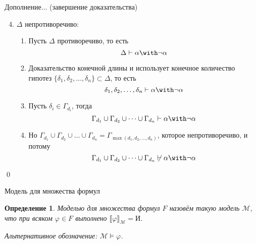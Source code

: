 \documentclass[aspectratio=169]{beamer}
\newtheorem{dfn}{Определение}[section]
\begin{document}
\begin{frame}{Дополнение... (завершение доказательства)}\vspace{-1cm}
\begin{block}{}
\begin{enumerate}\setcounter{enumi}{3}
  \item $\Delta$ непротиворечиво:
  \begin{enumerate}
    \item Пусть $\Delta$ противоречиво, то есть $$\Delta \vdash \alpha\with\neg\alpha$$\pause\vspace{-0.2cm}
    \item Доказательство конечной длины и использует конечное количество гипотез $\{\delta_1, \delta_2, \dots, \delta_n\} \subset \Delta$,
          то есть $$\delta_1, \delta_2, \dots, \delta_n \vdash \alpha\with\neg\alpha$$\pause\vspace{-0.2cm}
    \item Пусть $\delta_i \in \Gamma_{d_i}$, тогда $$\Gamma_{d_1}\cup \Gamma_{d_2}\cup \dots\cup \Gamma_{d_n} \vdash \alpha\with\neg\alpha$$\pause\vspace{-0.2cm}
    \item Но $\Gamma_{d_1} \cup \Gamma_{d_2} \cup \dots \cup \Gamma_{d_n} = \Gamma_{\max(d_1,d_2,\dots,d_n)}$,
          которое непротиворечиво, и потому $$\Gamma_{d_1}\cup \Gamma_{d_2}\cup \dots\cup \Gamma_{d_n} \not\vdash \alpha\with\neg\alpha$$
  \end{enumerate}\pause\vspace{-0.5cm}
\end{enumerate}
\qed
\end{block}
\end{frame}

\begin{frame}{Модель для множества формул}
\begin{dfn}Моделью для множества формул $F$ назовём такую модель $\mathcal{M}$, что
    при всяком $\varphi \in F$ выполнено $\llbracket\varphi\rrbracket_\mathcal{M} = \text{И}$.\pause

Альтернативное обозначение: $\mathcal{M}\models\varphi$.
\end{dfn}
\end{frame}
\end{document}
